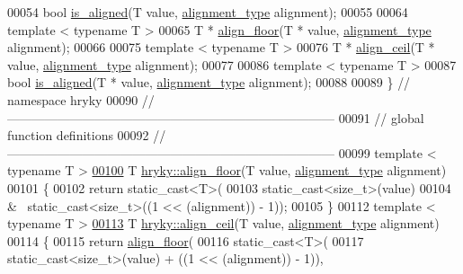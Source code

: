 \begin{DoxyCode}
00054     \textcolor{keywordtype}{bool} \hyperlink{namespacehryky_abb8da7a8ab9766df31c47826f2bf1a40}{is_aligned}(T value, \hyperlink{namespacehryky_aee1af251193c2d308aaa68ef7e36a540}{alignment_type} alignment);
00055 
00064     \textcolor{keyword}{template} < \textcolor{keyword}{typename} T >
00065     T * \hyperlink{namespacehryky_a84803d86a3bb217481dd0a180734fb8f}{align_floor}(T * value, \hyperlink{namespacehryky_aee1af251193c2d308aaa68ef7e36a540}{alignment_type} alignment);
00066 
00075     \textcolor{keyword}{template} < \textcolor{keyword}{typename} T >
00076     T * \hyperlink{namespacehryky_a7ddd0f39f2f0953fe7e3cbaedaf98644}{align_ceil}(T * value, \hyperlink{namespacehryky_aee1af251193c2d308aaa68ef7e36a540}{alignment_type} alignment);
00077 
00086     \textcolor{keyword}{template} < \textcolor{keyword}{typename} T >
00087     \textcolor{keywordtype}{bool} \hyperlink{namespacehryky_abb8da7a8ab9766df31c47826f2bf1a40}{is_aligned}(T * value, \hyperlink{namespacehryky_aee1af251193c2d308aaa68ef7e36a540}{alignment_type} alignment);
00088 
00089 \} \textcolor{comment}{// namespace hryky}
00090 \textcolor{comment}{//
      ------------------------------------------------------------------------------}
00091 \textcolor{comment}{// global function definitions}
00092 \textcolor{comment}{//
      ------------------------------------------------------------------------------}
00099 \textcolor{comment}{}\textcolor{keyword}{template} < \textcolor{keyword}{typename} T >
\hypertarget{align_8h_source_l00100}{}\hyperlink{namespacehryky_a84803d86a3bb217481dd0a180734fb8f}{00100} T \hyperlink{namespacehryky_a84803d86a3bb217481dd0a180734fb8f}{hryky::align_floor}(T value, \hyperlink{namespacehryky_aee1af251193c2d308aaa68ef7e36a540}{alignment_type} alignment)
00101 \{ 
00102     \textcolor{keywordflow}{return} \textcolor{keyword}{static\_cast<}T\textcolor{keyword}{>}(
00103         \textcolor{keyword}{static\_cast<}\textcolor{keywordtype}{size\_t}\textcolor{keyword}{>}(value)
00104         & ~static\_cast<size\_t>((1 << (alignment)) - 1));
00105 \}
00112 \textcolor{keyword}{template} < \textcolor{keyword}{typename} T >
\hypertarget{align_8h_source_l00113}{}\hyperlink{namespacehryky_a7ddd0f39f2f0953fe7e3cbaedaf98644}{00113} T \hyperlink{namespacehryky_a7ddd0f39f2f0953fe7e3cbaedaf98644}{hryky::align_ceil}(T value, \hyperlink{namespacehryky_aee1af251193c2d308aaa68ef7e36a540}{alignment_type} alignment)
00114 \{
00115     \textcolor{keywordflow}{return} \hyperlink{namespacehryky_a84803d86a3bb217481dd0a180734fb8f}{align_floor}(
00116         static\_cast<T>(
00117             static\_cast<size\_t>(value) + ((1 << (alignment)) - 1)),

\end{DoxyCode}
